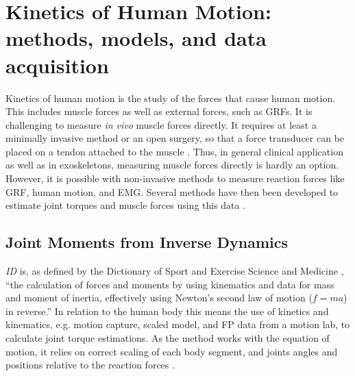 \documentclass[../main.tex]{subfiles}
\begin{document}
\section{Kinetics of Human Motion: methods, models, and data acquisition}
\label{sec:A-MSModels}
Kinetics of human motion is the study of the forces that cause human motion. 
This includes muscle forces as well as external forces, such as \acp{GRF}.
It is challenging to measure \textit{in vivo} muscle forces directly.
It requires at least a minimally invasive method or an open surgery, so that a force transducer can be placed on a tendon attached to the muscle \cite{Erdemir2007}. 
Thus, in general clinical application as well as in exoskeletons, measuring muscle forces directly is hardly an option.
However, it is possible with non-invasive methods to measure reaction forces like \ac{GRF}, human motion, and \ac{EMG}.
Several methods have then been developed to estimate joint torques and muscle forces using this data \cite{Erdemir2007}.

\subsection{Joint Moments from Inverse Dynamics}
\label{sec:A-Inverse-Dynamics}
\textit{\Acf{ID}} is, as defined by the Dictionary of Sport and Exercise Science and Medicine \cite{inversedynamics}, ``the calculation of forces and moments by using kinematics and data for mass and moment of inertia, effectively using Newton's second law of motion ($f = ma$) in reverse.''
In relation to the human body this means the use of kinetics and kinematics, e.g. motion capture, scaled model, and \ac{FP} data from a motion lab, to calculate joint torque estimations.
As the method works with the equation of motion, it relies on correct scaling of each body segment, and joints angles and positions relative to the reaction forces \cite{Erdemir2007, Buchanan2004}.
\end{document}

